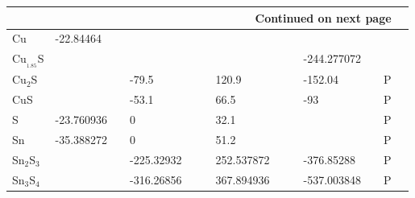 \begin{landscape}
\begin{center}
\begin{longtable}{|l|p{2.5cm}|l|p{2.5cm}|l|l|p{2.5cm}|l|l|p{2.5cm}|l|l|l|}
\hline \multicolumn{12}{|r|}{{Continued on next page}} \\ \hline
\endfoot

\hline
\endlastfoot

Cu                 & -22.84464                  & \citep{Barin1977} &                     &     &                                              &                    &     &                                              &                                     &     &                   \\
Cu$_{_1.85}$S           &                            &                   &                     &     &                                              &                    &     &                                              & -244.277072                         &     & \citep{Hiroi1986} \\
Cu$_2$S              &                            &                   & -79.5               &     & \citep{Haynes2013}                           & 120.9              &     & \citep{Haynes2013}                           & -152.04                             &     & P                 \\
CuS                &                            &                   & -53.1               &     & \citep{Haynes2013}                           & 66.5               &     & \citep{Haynes2013}                           & -93                                 &     & P                 \\
S                  & -23.760936                 & \citep{Barin1977} & 0                   &     & \citep{Barin1977}                            & 32.1               &     & \citep{Haynes2013}                           &                                     &     &          P         \\
Sn                 & -35.388272                 & \citep{Barin1977} & 0                   &     & \citep{Barin1977}                            & 51.2               &     & \citep{Haynes2013}                           &                                     &     &           P        \\
Sn$_2$S$_3$            &                            &                   & -225.32932          &     & \citep{Barin1977}                            & 252.537872         &     & \citep{Barin1977}                            & -376.85288                          &     &       P            \\
Sn$_3$S$_4$            &                            &                   & -316.26856          &     & \citep{Barin1977}                            & 367.894936         &     & \citep{Barin1977}                            & -537.003848                         &     &       P            \\

\end{longtable}
\end{center}
\end{landscape}

